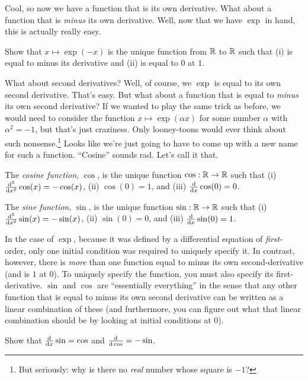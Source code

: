 Cool, so now we have a function that is its own derivative.  What about a function that is \emph{minus} its own derivative.  Well, now that we have $\exp$ in hand, this is actually really easy.
\begin{exr}
Show that $x\mapsto \exp (-x)$ is the unique function from $\mathbb{R}$ to $\mathbb{R}$ such that (i) is equal to minus its derivative and (ii) is equal to $0$ at $1$.
\end{exr}

What about second derivatives?  Well, of course, we $\exp$ is equal to its own second derivative.  That's easy.  But what about a function that is equal to \emph{minus} its own second derivative?  If we wanted to play the same trick as before, we would need to consider the function $x\mapsto \exp (\alpha x)$ for some number $\alpha$ with $\alpha ^2=-1$, but that's just craziness.  Only looney-toons would ever think about such nonsense.\footnote{But seriously:  why is there no \emph{real} number whose square is $-1$?}  Looks like we're just going to have to come up with a new name for such a function.  ``Cosine'' sounds rad.  Let's call it that.
\begin{dfn}
The \emph{cosine function}, $\cos$\index[notation]{$\cos$}, is the unique function $\cos :\mathbb{R} \rightarrow \mathbb{R}$ such that (i) $\frac{\mathop{}\!\mathrm{d} ^2}{\mathop{}\!\mathrm{d} x^2}\cos (x)=-\cos (x)$, (ii) $\cos (0)=1$, and (iii) $\frac{\mathop{}\!\mathrm{d}}{\mathop{}\!\mathrm{d} x}\cos (0)=0$.

The \emph{sine function}, $\sin$\index[notation]{$\sin$}, is the unique function $\sin :\mathbb{R} \rightarrow \mathbb{R}$ such that (i) $\frac{\mathop{}\!\mathrm{d} ^2}{\mathop{}\!\mathrm{d} x^2}\sin (x)=-\sin (x)$, (ii) $\sin (0)=0$, and (iii) $\frac{\mathop{}\!\mathrm{d}}{\mathop{}\!\mathrm{d} x}\sin (0)=1$.
\begin{rmk}
In the case of $\exp$, because it was defined by a differential equation of \emph{first}-order, only one initial condition was required to uniquely specify it.  In contrast, however, there is \emph{more} than one function equal to minus its own second-derivative (and is $1$ at $0$).  To uniquely specify the function, you must also specify its first-derivative.  $\sin$ and $\cos$ are ``essentially everything'' in the sense that any other function that is equal to minus its own second derivative can be written as a linear combination of these (and furthermore, you can figure out what that linear combination should be by looking at initial conditions at $0$).
\end{rmk}
\end{dfn}
\begin{exr}
Show that $\frac{\mathop{}\!\mathrm{d}}{\mathop{}\!\mathrm{d} x}\sin =\cos$ and $\frac{\mathop{}\!\mathrm{d}}{\mathop{}\!\mathrm{d} \cos}=-\sin$.
\end{exr}


